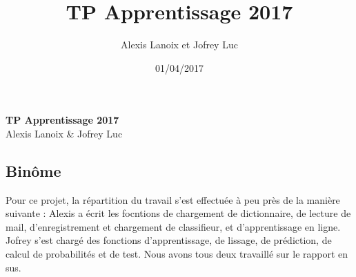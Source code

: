 \documentclass{report}
\author{Alexis Lanoix et Jofrey Luc}
\title{TP Apprentissage 2017}
\date{01/04/2017}
\begin{document}
\vspace{2cm}
\begin{center}
  \Large\textbf{TP Apprentissage 2017}\\
  \large{Alexis Lanoix \& Jofrey Luc}
\end{center}
\vspace{1cm}

\subsection*{Binôme}

Pour ce projet, la répartition du travail s'est effectuée à peu près de la manière suivante : Alexis a écrit les focntions de chargement de dictionnaire, de lecture de mail, d'enregistrement et chargement de classifieur, et d'apprentissage en ligne. Jofrey s'est chargé des fonctions d'apprentissage, de lissage, de prédiction, de calcul de probabilités et de test. Nous avons tous deux travaillé sur le rapport en sus.
\end{document}
